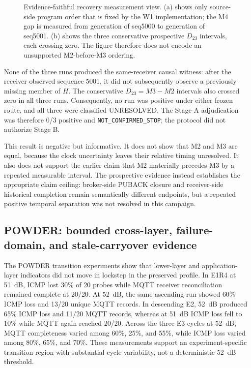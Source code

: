 \documentclass[journal]{IEEEtran}
\begin{document}
\begin{figure}[t]
{%
}
\caption{Evidence-faithful recovery measurement view. (a) shows only source-side program order that is fixed by the W1 implementation; the M4 gap is measured from generation of seq5000 to generation of seq5001. (b) shows the three conservative prospective $D_{23}$ intervals, each crossing zero. The figure therefore does not encode an unsupported M2-before-M3 ordering.}
\label{fig:recoveryview}
\end{figure}

None of the three runs produced the same-receiver causal witness: after the receiver observed sequence 5001, it did not subsequently observe a previously missing member of $H$. The conservative $D_{23}=M3-M2$ intervals also crossed zero in all three runs. Consequently, no run was positive under either frozen route, and all three were classified UNRESOLVED. The Stage-A adjudication was therefore 0/3 positive and \texttt{NOT\_CONFIRMED\_STOP}; the protocol did not authorize Stage B.

This result is negative but informative. It does not show that M2 and M3 are equal, because the clock uncertainty leaves their relative timing unresolved. It also does not support the earlier claim that M2 materially precedes M3 by a repeated measurable interval. The prospective evidence instead establishes the appropriate claim ceiling: broker-side PUBACK closure and receiver-side historical completion remain semantically different endpoints, but a repeated positive temporal separation was not resolved in this campaign.

\subsection{POWDER: bounded cross-layer, failure-domain, and stale-carryover evidence}

The POWDER transition experiments show that lower-layer and application-layer indicators did not move in lockstep in the preserved profile. In E1R4 at 51~dB, ICMP lost 30\% of 20 probes while MQTT receiver reconciliation remained complete at 20/20. At 52~dB, the same ascending run showed 60\% ICMP loss and 13/20 unique MQTT records. In descending E2, 52~dB produced 65\% ICMP loss and 11/20 MQTT records, whereas at 51~dB ICMP loss fell to 10\% while MQTT again reached 20/20. Across the three E3 cycles at 52~dB, MQTT completeness varied among 60\%, 25\%, and 55\%, while ICMP loss varied among 80\%, 65\%, and 70\%. These measurements support an experiment-specific transition region with substantial cycle variability, not a deterministic 52~dB threshold.
\end{document}
